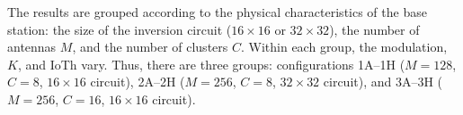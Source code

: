 The results are grouped according to the physical characteristics of the base station: the size of the inversion circuit ($16 \times 16$ or $32 \times 32$), the number of antennas $M$, and the number of clusters $C$. Within each group, the modulation, $K$, and IoTh vary. Thus, there are three groups: configurations 1A–1H ($M = 128$, $C = 8$, $16 \times 16$ circuit), 2A–2H ($M = 256$, $C = 8$, $32 \times 32$ circuit), and 3A–3H ($M = 256$, $C = 16$, $16 \times 16$ circuit).

